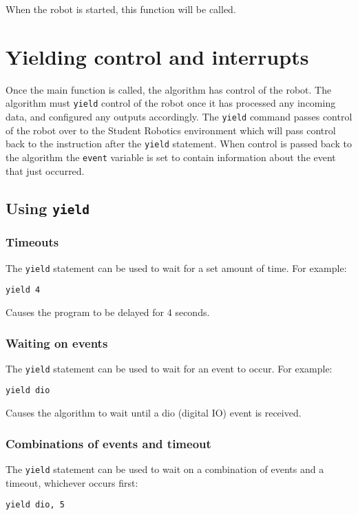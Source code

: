 \documentclass{article}
\begin{document}
When the robot is started, this function will be called.
\section{Yielding control and interrupts}
Once the main function is called, the algorithm has control of the robot.  The
algorithm must \texttt{yield} control of the robot once it has
processed any incoming data, and configured any outputs accordingly.
The \texttt{yield} command passes control of the robot over to the
Student Robotics environment which will pass control back to the instruction
after the \texttt{yield} statement.  When control is passed back to the
algorithm the \texttt{event} variable is set to contain information
about the event that just occurred.

\subsection{Using \texttt{yield}}
\subsubsection{Timeouts}
The \texttt{yield} statement can be used to wait for a set amount of
time.  For example:

\begin{verbatim}
yield 4
\end{verbatim}

Causes the program to be delayed for 4 seconds.

\subsubsection{Waiting on events}
The \texttt{yield} statement can be used to wait for an event to
occur.  For example:

\begin{verbatim}
yield dio
\end{verbatim}

Causes the algorithm to wait until a dio (digital IO) event is received.

\subsubsection{Combinations of events and timeout}
The \texttt{yield} statement can be used to wait on a combination of events and
a timeout, whichever occurs first:

\begin{verbatim}
yield dio, 5
\end{verbatim}
\end{document}
